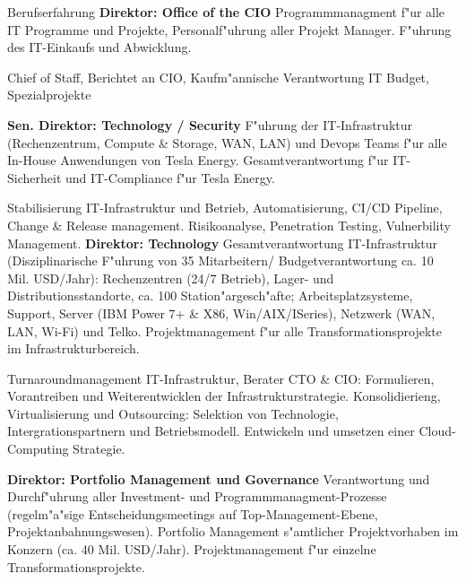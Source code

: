 \begin{rubric}{Berufserfahrung}
\entry*[12/2016 - heute] \textbf{Direktor: Office of the CIO}\newline
{} 
Programmmanagment f"ur alle IT Programme und Projekte, Personalf"uhrung aller Projekt Manager. F"uhrung des IT-Einkaufs und Abwicklung. 

Chief of Staff, Berichtet an CIO, Kaufm"annische Verantwortung IT Budget, Spezialprojekte 

\entry*[08/2015 - 12/2016] \textbf{Sen. Direktor: Technology / Security}\newline
{} 
F"uhrung der IT-Infrastruktur (Rechenzentrum, Compute \& Storage, WAN, LAN) und Devops Teams f"ur alle In-House Anwendungen von Tesla Energy. Gesamtverantwortung f"ur IT-Sicherheit und IT-Compliance f"ur Tesla Energy.

Stabilisierung IT-Infrastruktur und Betrieb, Automatisierung, CI/CD Pipeline, Change \& Release management. Risikoanalyse, Penetration Testing, Vulnerbility Management.
\pagebreak
{}
\entry*[04/2013 - 08/2015] \textbf{Direktor: Technology}\newline
{} 
Gesamtverantwortung IT-Infrastruktur (Disziplinarische F"uhrung von 35 Mitarbeitern/ Budgetverantwortung ca. 10 Mil. USD/Jahr): Rechenzentren (24/7 Betrieb), Lager- und Distributionsstandorte, ca. 100 Station"argesch"afte; Arbeitsplatzsysteme, Support, Server (IBM Power 7+ \& X86, Win/AIX/ISeries), Netzwerk (WAN, LAN, Wi-Fi) und Telko. Projektmanagement f"ur alle Transformationsprojekte im Infrastrukturbereich.

Turnaroundmanagement IT-Infrastruktur, Berater CTO \& CIO: Formulieren, Vorantreiben und Weiterentwicklen der Infrastrukturstrategie. Konsolidierieng, Virtualisierung und Outsourcing: Selektion von Technologie, Intergrationspartnern und Betriebsmodell. Entwickeln und umsetzen einer Cloud-Computing Strategie.

\entry*[10/2011 - 03/2013] \textbf{Direktor: Portfolio Management und Governance}\newline
{} 
Verantwortung und Durchf"uhrung aller Investment- und Programmmanagment-Prozesse (regelm"a"sige Entscheidungsmeetings auf Top-Management-Ebene, Projektanbahnungswesen). Portfolio Management s"amtlicher Projektvorhaben im Konzern (ca. 40 Mil. USD/Jahr). Projektmanagement f"ur einzelne Transformationsprojekte.\axelvspace


\end{rubric}
